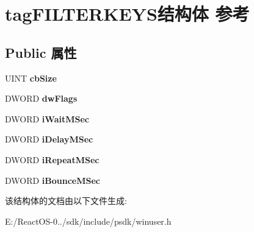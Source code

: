 \hypertarget{structtag_f_i_l_t_e_r_k_e_y_s}{}\section{tag\+F\+I\+L\+T\+E\+R\+K\+E\+Y\+S结构体 参考}
\label{structtag_f_i_l_t_e_r_k_e_y_s}
\subsection*{Public 属性}
\begin{DoxyCompactItemize}
\item 
\mbox{\label{structtag_f_i_l_t_e_r_k_e_y_s_a4dae6453da1759be40d2d4e09d6ad4c4}} 
U\+I\+NT {\bfseries cb\+Size}
\item 
\mbox{\label{structtag_f_i_l_t_e_r_k_e_y_s_afe21c50a82af0a66af97a6cb23a6ab10}} 
D\+W\+O\+RD {\bfseries dw\+Flags}
\item 
\mbox{\label{structtag_f_i_l_t_e_r_k_e_y_s_aa99899b20d6032c89df0f572c2cebe09}} 
D\+W\+O\+RD {\bfseries i\+Wait\+M\+Sec}
\item 
\mbox{\label{structtag_f_i_l_t_e_r_k_e_y_s_ae4f4918b294d7afc5099fe93facdeb37}} 
D\+W\+O\+RD {\bfseries i\+Delay\+M\+Sec}
\item 
\mbox{\label{structtag_f_i_l_t_e_r_k_e_y_s_a69df77cd030585f8fd02b91e4b871310}} 
D\+W\+O\+RD {\bfseries i\+Repeat\+M\+Sec}
\item 
\mbox{\label{structtag_f_i_l_t_e_r_k_e_y_s_adc77e589674f6c24d2c4bfaba4433a45}} 
D\+W\+O\+RD {\bfseries i\+Bounce\+M\+Sec}
\end{DoxyCompactItemize}


该结构体的文档由以下文件生成\+:\begin{DoxyCompactItemize}
\item 
E\+:/\+React\+O\+S-\/0../sdk/include/psdk/winuser.\+h\end{DoxyCompactItemize}
